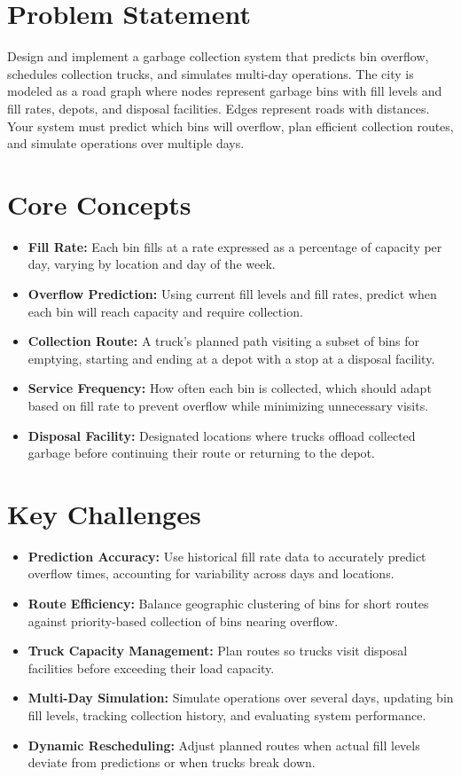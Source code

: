 \section{Problem Statement}

Design and implement a garbage collection system that predicts bin overflow, schedules collection trucks, and simulates multi-day operations. The city is modeled as a road graph where nodes represent garbage bins with fill levels and fill rates, depots, and disposal facilities. Edges represent roads with distances. Your system must predict which bins will overflow, plan efficient collection routes, and simulate operations over multiple days.

\section{Core Concepts}

\begin{itemize}
  \item \textbf{Fill Rate:} Each bin fills at a rate expressed as a percentage of capacity per day, varying by location and day of the week.
  \item \textbf{Overflow Prediction:} Using current fill levels and fill rates, predict when each bin will reach capacity and require collection.
  \item \textbf{Collection Route:} A truck's planned path visiting a subset of bins for emptying, starting and ending at a depot with a stop at a disposal facility.
  \item \textbf{Service Frequency:} How often each bin is collected, which should adapt based on fill rate to prevent overflow while minimizing unnecessary visits.
  \item \textbf{Disposal Facility:} Designated locations where trucks offload collected garbage before continuing their route or returning to the depot.
\end{itemize}

\section{Key Challenges}

\begin{itemize}
  \item \textbf{Prediction Accuracy:} Use historical fill rate data to accurately predict overflow times, accounting for variability across days and locations.
  \item \textbf{Route Efficiency:} Balance geographic clustering of bins for short routes against priority-based collection of bins nearing overflow.
  \item \textbf{Truck Capacity Management:} Plan routes so trucks visit disposal facilities before exceeding their load capacity.
  \item \textbf{Multi-Day Simulation:} Simulate operations over several days, updating bin fill levels, tracking collection history, and evaluating system performance.
  \item \textbf{Dynamic Rescheduling:} Adjust planned routes when actual fill levels deviate from predictions or when trucks break down.
\end{itemize}

